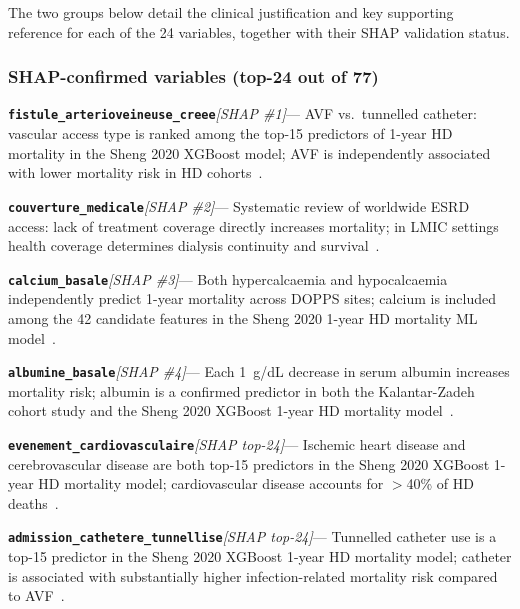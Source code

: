 \documentclass[12pt,a4paper,twoside]{report}
\begin{document}
The two groups below detail the clinical justification and key supporting reference for each of the 24 variables, together with their SHAP validation status.

\subsubsection*{SHAP-confirmed variables (top-24 out of 77)}
\label{tab:var_evidence}

\newcommand{\varentry}[3]{%
  \noindent\textcolor{primary}{\textbf{\texttt{#1}}}\enspace\textit{\small[#2]}\enspace---\enspace
  #3\par\smallskip}

\varentry{fistule\_arterioveineuse\_creee}{SHAP \#1}{%
  AVF vs.\ tunnelled catheter: vascular access type is ranked among the top-15
  predictors of 1-year HD mortality in the Sheng 2020 XGBoost model; AVF is
  independently associated with lower mortality risk in HD
  cohorts~\cite{sheng2020}.}

\varentry{couverture\_medicale}{SHAP \#2}{%
  Systematic review of worldwide ESRD access: lack of treatment coverage directly
  increases mortality; in LMIC settings health coverage determines dialysis
  continuity and survival~\cite{liyanage2015, usrds2022}.}

\varentry{calcium\_basale}{SHAP \#3}{%
  Both hypercalcaemia and hypocalcaemia independently predict 1-year mortality
  across DOPPS sites; calcium is included among the 42 candidate features in
  the Sheng 2020 1-year HD mortality ML
  model~\cite{tentori2008, sheng2020}.}

\varentry{albumine\_basale}{SHAP \#4}{%
  Each 1~g/dL decrease in serum albumin increases mortality risk; albumin is a
  confirmed predictor in both the Kalantar-Zadeh cohort study and the Sheng 2020
  XGBoost 1-year HD mortality model~\cite{albumin_dialysis_2018, sheng2020}.}

\varentry{evenement\_cardiovasculaire}{SHAP top-24}{%
  Ischemic heart disease and cerebrovascular disease are both top-15 predictors
  in the Sheng 2020 XGBoost 1-year HD mortality model; cardiovascular disease
  accounts for $>$40\% of HD deaths~\cite{foley1998cv, sheng2020}.}

\varentry{admission\_cathetere\_tunnellise}{SHAP top-24}{%
  Tunnelled catheter use is a top-15 predictor in the Sheng 2020 XGBoost
  1-year HD mortality model; catheter is associated with substantially higher
  infection-related mortality risk compared to AVF~\cite{sheng2020}.}
\end{document}
